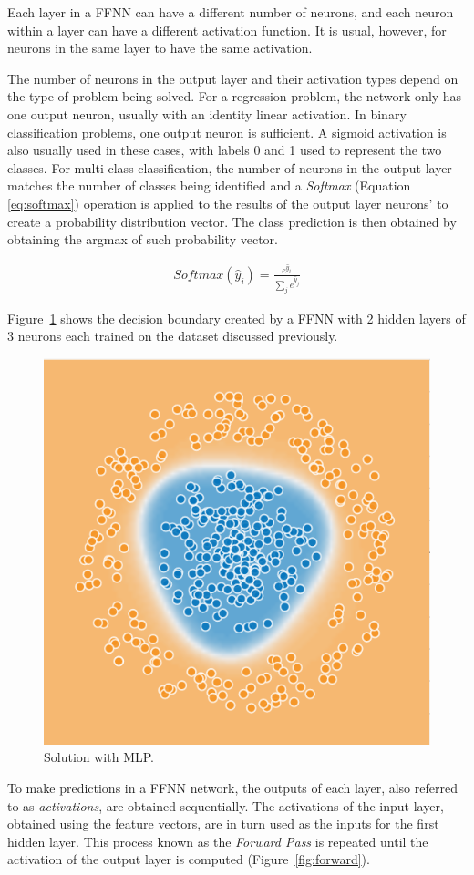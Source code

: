 Each layer in a FFNN can have a different number of neurons, and each neuron
within a layer can have a different activation function. It is usual, however,
for neurons in the same layer to have the same activation. 

The number of neurons in the output layer and their activation types depend on
the type of problem being solved. For a regression problem, the network only has
one output neuron, usually with an identity linear activation. In binary
classification problems, one output neuron is sufficient. A sigmoid activation
is also usually used in these cases, with labels 0 and 1 used to represent the
two classes. For multi-class classification, the number of neurons in the output
layer matches the number of classes being identified and a \textit{Softmax}
(Equation \ref{eq:softmax}) operation is applied to the results of the output
layer neurons' to create a probability distribution vector. The class prediction
is then obtained by obtaining the argmax of such probability vector.

\begin{align}
    \textit{Softmax}(\hat{y}_i) = \frac{e^{\hat{y}_i}}{\sum\limits_j e^{\hat{y}_j}}
    \label{eq:softmax}
\end{align}

Figure~\ref{fig:mlp_solved} shows the decision boundary created by a FFNN with 2
hidden layers of 3 neurons each trained on the dataset discussed previously.

\begin{figure}[!htbp]
    \centering
    \includegraphics[width=.35\textwidth]{Images/circles_solved.png}
    \caption{Solution with MLP.}
    \label{fig:mlp_solved}
\end{figure}

To make predictions in a FFNN network, the outputs of each layer, also referred
to as \textit{activations}, are obtained sequentially. The activations of the
input layer, obtained using the feature vectors, are in turn used as the inputs
for the first hidden layer. This process known as the \textit{Forward Pass} is
repeated until the activation of the output layer is computed
(Figure~\ref{fig:forward}).

